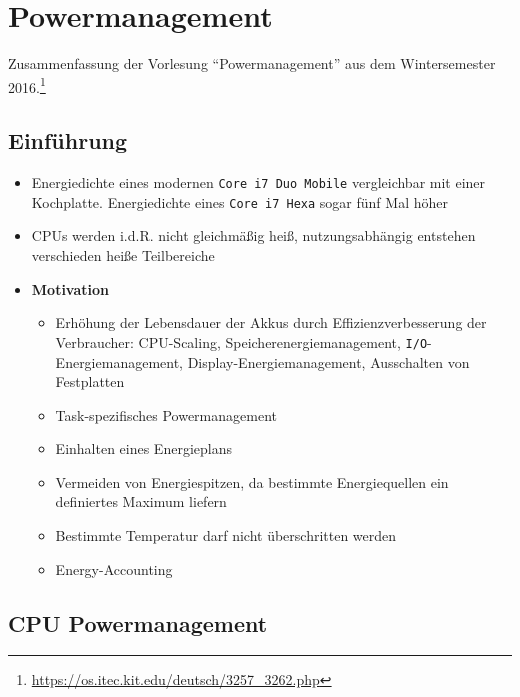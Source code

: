 \chapter{Powermanagement}

Zusammenfassung der Vorlesung "`Powermanagement"' aus dem Wintersemester 2016.\footnote{\url{https://os.itec.kit.edu/deutsch/3257_3262.php}}

\section{Einführung}
\begin{itemize}
	\item Energiedichte eines modernen \texttt{Core i7 Duo Mobile} vergleichbar mit einer Kochplatte. Energiedichte eines \texttt{Core i7 Hexa} sogar fünf Mal höher
	\item CPUs werden i.d.R. nicht gleichmäßig heiß, nutzungsabhängig entstehen verschieden heiße Teilbereiche
	\item \textbf{Motivation}
	\begin{itemize}
		\item Erhöhung der Lebensdauer der Akkus durch Effizienzverbesserung der Verbraucher: CPU-Scaling, Speicherenergiemanagement, \texttt{I/O}-Energiemanagement, Display-Energiemanagement, Ausschalten von Festplatten
		\item Task-spezifisches Powermanagement
		\item Einhalten eines Energieplans
		\item Vermeiden von Energiespitzen, da bestimmte Energiequellen ein definiertes Maximum liefern
		\item Bestimmte Temperatur darf nicht überschritten werden
		\item Energy-Accounting
	\end{itemize}
\end{itemize}



\section{CPU Powermanagement}

